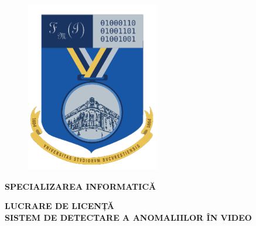 \documentclass[a4paper,12pt]{report}
\begin{document}
\begin{titlepage}
\begin{center}
\begin{figure}[htbp]
            \begin{minipage}{0.2\textwidth}
              \includegraphics[width=\linewidth]{images/poza_dreapta.png}
            \end{minipage}
        \end{figure}
        
        \vspace*{1cm}
        
        \begin{large}
            \textbf{SPECIALIZAREA INFORMATICĂ}
        \end{large}

        \vspace{2.5cm}
        \begin{LARGE}
            \textbf{LUCRARE DE LICENȚĂ}\\
            \vspace*{0.5cm}
            \textbf{SISTEM DE DETECTARE A ANOMALIILOR ÎN VIDEO}
        \end{LARGE}
            

\end{center}
\end{titlepage}
\end{document}
